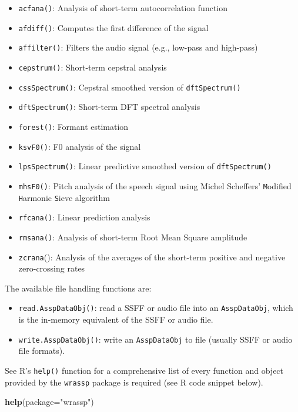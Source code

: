 \documentclass[]{book}
\newenvironment{Shaded}{\begin{snugshade}}{\end{snugshade}}
\newcommand{\DataTypeTok}[1]{\textcolor[rgb]{0.13,0.29,0.53}{#1}}
\newcommand{\KeywordTok}[1]{\textcolor[rgb]{0.13,0.29,0.53}{\textbf{#1}}}
\newcommand{\NormalTok}[1]{#1}
\newcommand{\StringTok}[1]{\textcolor[rgb]{0.31,0.60,0.02}{#1}}
\providecommand{\tightlist}{%
  \setlength{\itemsep}{0pt}\setlength{\parskip}{0pt}}
\theoremstyle{definition}
\theoremstyle{definition}
\theoremstyle{definition}
\theoremstyle{remark}
\begin{document}
\begin{itemize}
\tightlist
\item
  \texttt{acfana()}: Analysis of short-term autocorrelation function
\item
  \texttt{afdiff()}: Computes the first difference of the signal
\item
  \texttt{affilter()}: Filters the audio signal (e.g., low-pass and
  high-pass)
\item
  \texttt{cepstrum()}: Short-term cepstral analysis
\item
  \texttt{cssSpectrum()}: Cepstral smoothed version of
  \texttt{dftSpectrum()}
\item
  \texttt{dftSpectrum()}: Short-term DFT spectral analysis
\item
  \texttt{forest()}: Formant estimation
\item
  \texttt{ksvF0()}: F0 analysis of the signal
\item
  \texttt{lpsSpectrum()}: Linear predictive smoothed version of
  \texttt{dftSpectrum()}
\item
  \texttt{mhsF0()}: Pitch analysis of the speech signal using Michel
  Scheffers' \texttt{M}odified \texttt{H}armonic \texttt{S}ieve
  algorithm
\item
  \texttt{rfcana()}: Linear prediction analysis
\item
  \texttt{rmsana()}: Analysis of short-term Root Mean Square amplitude
\item
  \texttt{zcrana}(): Analysis of the averages of the short-term positive
  and negative zero-crossing rates
\end{itemize}

The available file handling functions are:

\begin{itemize}
\tightlist
\item
  \texttt{read.AsspDataObj()}: read a SSFF or audio file into an
  \texttt{AsspDataObj}, which is the in-memory equivalent of the SSFF or
  audio file.
\item
  \texttt{write.AsspDataObj()}: write an \texttt{AsspDataObj} to file
  (usually SSFF or audio file formats).
\end{itemize}

See R's \texttt{help()} function for a comprehensive list of every
function and object provided by the \texttt{wrassp} package is required
(see R code snippet below).

\begin{Shaded}
\begin{Highlighting}[]
\KeywordTok{help}\NormalTok{(}\DataTypeTok{package=}\StringTok{"wrassp"}\NormalTok{)}
\end{Highlighting}
\end{Shaded}
\end{document}
